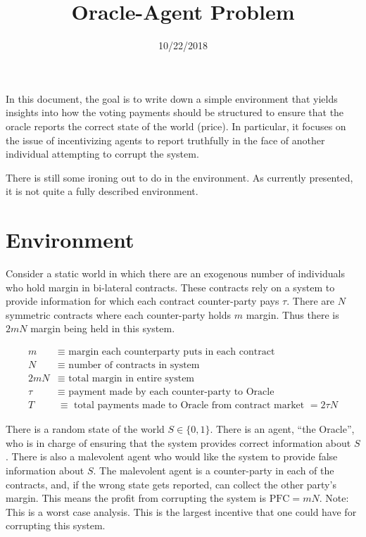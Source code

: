 \documentclass[12pt]{article}
\title{Oracle-Agent Problem}
\author{}
\date{10/22/2018}
\begin{document}
\maketitle

In this document, the goal is to write down a simple environment that yields insights into how the
voting payments should be structured to ensure that the oracle reports the correct state of the
world (price). In particular, it focuses on the issue of incentivizing agents to report truthfully
in the face of another individual attempting to corrupt the system.

There is still some ironing out to do in the environment. As currently presented, it is not quite a
fully described environment.

\section{Environment}

  Consider a static world in which there are an exogenous number of individuals who hold margin in
  bi-lateral contracts. These contracts rely on a system to provide information for which each
  contract counter-party pays $\tau$. There are $N$ symmetric contracts where each counter-party
  holds $m$ margin. Thus there is $2mN$ margin being held in this system.

  \begin{align*}
    m &\equiv \text{ margin each counterparty puts in each contract}\\
    N &\equiv \text{ number of contracts in system}\\
    2mN &\equiv \text{ total margin in entire system}\\
    \tau &\equiv \text{ payment made by each counter-party to Oracle} \\
    T &\equiv \text{ total payments made to Oracle from contract market } = 2 \tau N
  \end{align*}

  There is a random state of the world $S \in \{0, 1\}$. There is an agent, ``the Oracle'', who is
  in charge of ensuring that the system provides correct information about $S$. There is also a
  malevolent agent who would like the system to provide false information about $S$. The malevolent
  agent is a counter-party in each of the contracts, and, if the wrong state gets reported, can
  collect the other party's margin. This means the profit from corrupting the system is $\text{PFC}
  = mN$. Note: This is a worst case analysis. This is the largest incentive that one could have
  for corrupting this system.
\end{document}
